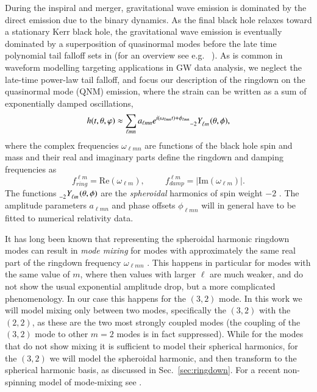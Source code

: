 \documentclass[twocolumn,prd,aps,superscriptaddress,preprintnumbers,tightenlines,showpacs,nofootinbib,eqsecnum,amsfonts,amsmath]{revtex4}
\begin{document}
During the inspiral and merger, gravitational wave emission is dominated by the direct emission due to the binary dynamics.
As the final black hole relaxes toward a stationary Kerr black hole, the gravitational wave emission is eventually dominated
by a superposition of quasinormal modes before the late time polynomial tail falloff sets in (for an overview see e.g.~
\cite{Andersson:1996cm,Kokkotas1999}).
As is common in waveform modelling targeting applications in GW data analysis, we neglect the late-time power-law tail falloff, and focus our description of the ringdown on the quasinormal mode (QNM) emission, where the strain can be written as a sum of exponentially damped oscillations,
\begin{equation}\label{eq:QNM}
h(t,\theta,\varphi)  \approx \sum_{\ell m n} a_{\ell m n} e^{i (\omega_{\ell m n} t) + \phi_{\ell m n}} \tensor[_{-2}]{Y}{_{\ell m}} (\theta,\phi),
\end{equation}
where the complex frequencies $\omega_{\ell m n}$ are functions of the black hole spin and mass and their real and imaginary parts define the ringdown and damping frequencies as 
\begin{equation}
f_{ring}^{\ell m} = \mathrm{Re}(\omega_{\ell m}), \hspace{1cm} f_{damp}^{\ell m} = |\mathrm{Im}(\omega_{\ell m})|.
\end{equation}
The functions 
 $\tensor[_{-2}]{Y}{_{\ell m}} (\theta,\phi)$ are the {\em spheroidal} harmonics of spin weight $-2$ \cite{Teukolsky1972,Teukolsky1973}.
The amplitude parameters $a_{\ell m n}$ and phase offsets $\phi_{\ell m n}$ will in general have to be fitted to numerical relativity data.

It has long been known that representing the spheroidal harmonic ringdown modes can result in \textit{mode mixing} for modes with approximately the same real part of the ringdown frequency $\omega_{\ell m n}$ \cite{BertiMixingCoeffs,KB2012,London:2020uva}. This happens in particular for modes with the same value of $m$, where then values with larger $\ell$ are much weaker, and do not show the usual exponential amplitude drop, but a more complicated phenomenology. In our case this happens for the $(3,2)$ mode.
In this work we will model mixing only between two modes, specifically the $(3,2)$ with the $(2,2)$, as these are the two most strongly coupled modes (the coupling of the $(3,2)$ mode to other $m=2$ modes is in fact suppressed). While for the modes that do not show mixing it is sufficient to model their spherical harmonics, for the $(3,2)$ we will model the spheroidal harmonic, and then transform to the spherical harmonic basis, as discussed in Sec.~\ref{sec:ringdown}. 
For a recent non-spinning model of mode-mixing see
\cite{Mehta:2019wxm}.
\end{document}

